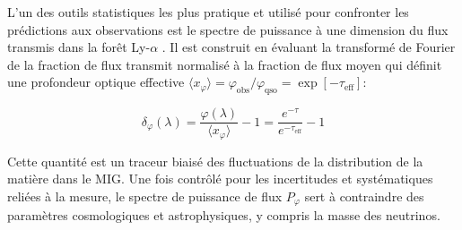 L'un des outils statistiques les plus pratique et utilisé pour confronter les prédictions aux observations est le spectre de puissance à une dimension du flux transmis dans la forêt Ly-$\alpha$ \citep{Croft1998, Croft1999}. Il est construit en évaluant la transformé de Fourier de la fraction de flux transmit normalisé à la fraction de flux moyen qui définit une profondeur optique effective $\langle x_\varphi \rangle = \varphi_\mathrm{obs} / \varphi_\mathrm{qso} = \exp \left[ - \tau_\mathrm{eff} \right]$:

\begin{equation}
\delta_\varphi \left( \lambda \right) = \frac{\varphi(\lambda)}{\langle x_\varphi \rangle} - 1 = \frac{e^{-\tau}}{e^{-\tau_\mathrm{eff}}} - 1
\end{equation}

Cette quantité est un traceur biaisé des fluctuations de la distribution de la matière dans le MIG. Une fois contrôlé pour les incertitudes et systématiques reliées à la mesure, le spectre de puissance de flux $P_\varphi$ sert à contraindre des paramètres cosmologiques et astrophysiques, y compris la masse des neutrinos.
